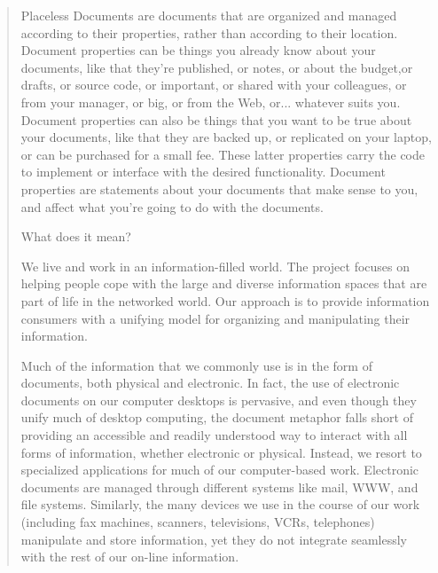 \begin{quotation}

    Placeless Documents are documents that are organized and managed according
    to their properties, rather than according to their location. Document
    properties can be things you already know about your documents, like that
    they're published, or notes, or about the budget,or drafts, or source code,
    or important, or shared with your colleagues, or from your manager, or big,
    or from the Web, or... whatever suits you. Document properties can also be
    things that you want to be true about your documents, like that they are
    backed up, or replicated on your laptop, or can be purchased for a small
    fee. These latter properties carry the code to implement or interface with
    the desired functionality.  Document properties are statements about your
    documents that make sense to you, and affect what you're going to do with
    the documents.

    What does it mean?

    We live and work in an information-filled world. The project focuses on helping people cope with the large and diverse information spaces that are part of life in the networked world. Our approach is to provide information consumers with a unifying model for organizing and manipulating their information.

    Much of the information that we commonly use is in the form of documents, both physical and electronic. In fact, the use of electronic documents on our computer desktops is pervasive, and even though they unify much of desktop computing, the document metaphor falls short of providing an accessible and readily understood way to interact with all forms of information, whether electronic or physical. Instead, we resort to specialized applications for much of our computer-based work. Electronic documents are managed through different systems like mail, WWW, and file systems. Similarly, the many devices we use in the course of our work (including fax machines, scanners, televisions, VCRs, telephones) manipulate and store information, yet they do not integrate seamlessly with the rest of our on-line information.


\end{quotation}
